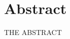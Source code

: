 \documentclass[main.tex]{subfiles}
\begin{document}
    \chapter*{Abstract}
    THE ABSTRACT
\end{document}
